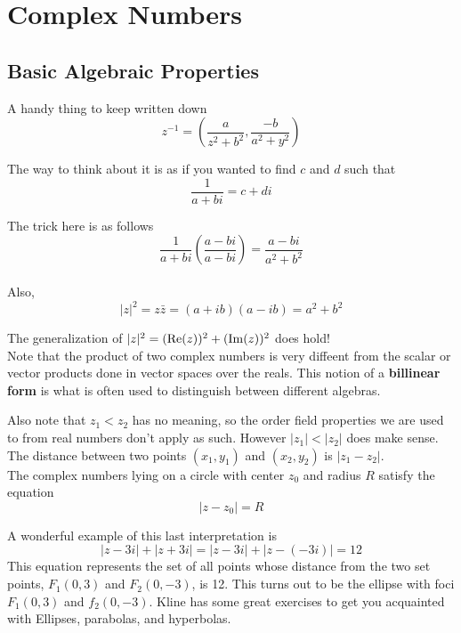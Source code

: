 \section{Complex Numbers}

\subsection{Basic Algebraic Properties}

A handy thing to keep written down
$$
z^{-1} = \left(\frac{a}{z^2 + b^2}, \frac{-b}{a^2 + y^2}\right)
$$

The way to think about it is as if you wanted to find $c$ and $d$ such that
$$
\frac{1}{a + bi} = c + di
$$

The trick here is as follows
$$
\frac{1}{a + bi} \left( \frac{a - bi}{a - bi} \right)= \frac{a - bi}{a^2 + b^2}
$$
\\



Also,
$$
|z|^2 = z\bar{z} = (a + ib)(a - ib) = a^2 + b^2
$$

The generalization of $|z|^2 = (\operatorname{Re}(z))^2 + (\operatorname{Im}(z))^2$ does hold!
\\


Note that the product of two complex numbers is very diffeent from the scalar or vector products
done in vector spaces over the reals.
This notion of a \textbf{billinear form} is what is often used to distinguish between different
algebras.

Also note that $z_1 < z_2$ has no meaning, so the order field properties we are used to from
real numbers don't apply as such.
However $|z_1| < |z_2|$ does make sense.
\\

The distance between two points $(x_1, y_1)$ and $(x_2, y_2)$ is $|z_1 - z_2|$.
\\

The complex numbers lying on a circle with center $z_0$ and radius $R$ satisfy the equation
$$
|z - z_0| = R
$$

A wonderful example of this last interpretation is
$$
|z - 3i| + |z + 3i| = |z - 3i| + |z - (-3i)| = 12
$$
This equation represents the set of all points whose distance from the two set points, $F_1(0,3)$
and $F_2(0,-3)$, is 12.
This turns out to be the ellipse with foci $F_1(0,3)$ and $f_2(0,-3)$.
Kline has some great exercises to get you acquainted with Ellipses, parabolas, and hyperbolas.


